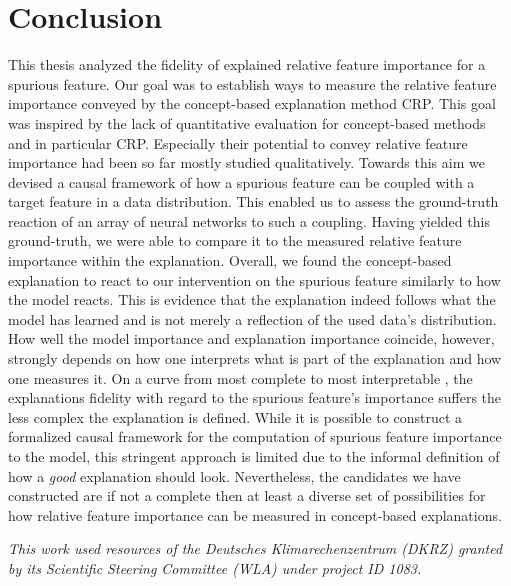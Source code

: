 \section{Conclusion}
This thesis analyzed the fidelity of explained relative feature importance for a spurious feature. 
Our goal was to establish ways to measure the relative feature importance conveyed by the concept-based explanation method CRP. This goal was inspired by the lack of quantitative evaluation for concept-based methods and in particular CRP. Especially their potential to convey relative feature importance had been so far mostly studied qualitatively. 
Towards this aim we devised a causal framework of how a spurious feature can be coupled with a target feature in a data distribution. This enabled us to assess the ground-truth reaction of an array of neural networks to such a coupling. Having yielded this ground-truth, we were able to compare it to the measured relative feature importance within the explanation. 
Overall, we found the concept-based explanation to react to our intervention on the spurious feature similarly to how the model reacts. This is evidence that the explanation indeed follows what the model has learned and is not merely a reflection of the used data's distribution. 
How well the model importance and explanation importance coincide, however, strongly depends on how one interprets what is part of the explanation and how one measures it.
On a curve from most complete to most interpretable \citep{Gilpin2019}, the explanations fidelity with regard to the spurious feature's importance suffers the less complex the explanation is defined. While it is possible to construct a formalized causal framework for the computation of spurious feature importance to the model, this stringent approach is limited due to the informal definition of how a \textit{good} explanation should look. Nevertheless, the candidates we have constructed are if not a complete then at least a diverse set of possibilities for how relative feature importance can be measured in concept-based explanations.


\textit{This work used resources of the Deutsches Klimarechenzentrum (DKRZ) granted by its Scientific Steering Committee (WLA) under project ID 1083.}